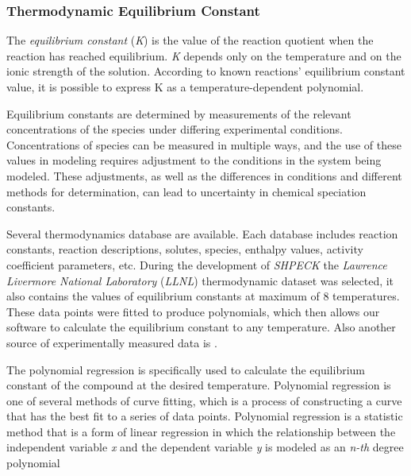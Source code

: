 \subsubsection{Thermodynamic Equilibrium Constant}
The \emph{equilibrium constant} (\emph{K}) is the value of the reaction quotient when the reaction has reached equilibrium. \emph{K} depends only on the temperature and on the ionic strength of the solution. According to known reactions' equilibrium constant value, it is possible to express K as a  temperature-dependent polynomial.

Equilibrium constants are determined by measurements of the relevant concentrations of the species under differing experimental conditions. Concentrations of species can be measured in multiple ways, and the use of these values in modeling requires adjustment to the conditions in the system being modeled. These adjustments, as well as the differences in conditions and different methods for determination, can lead to uncertainty in chemical speciation constants.

Several thermodynamics database are available. Each database includes reaction constants, reaction descriptions, solutes, species, enthalpy values, activity coefficient parameters, etc. During the development of \emph{SHPECK} the \emph{Lawrence Livermore National Laboratory} (\emph{LLNL}) thermodynamic dataset  was selected, it also contains the values of equilibrium constants at maximum of 8 temperatures. These data points were fitted to produce polynomials, which then allows our software to calculate the equilibrium constant to any temperature. Also another source of experimentally measured data is \cite{Palandri:04}.

The polynomial regression is specifically used to calculate the equilibrium constant of the compound at the desired temperature. Polynomial regression is one of several methods of curve fitting, which is a process of constructing a curve that has the best fit to a series of data points. Polynomial regression is a statistic method that is a form of linear regression in which the relationship between the independent variable \emph{x} and the dependent variable \emph{y} is modeled as an \emph{n-th} degree polynomial



